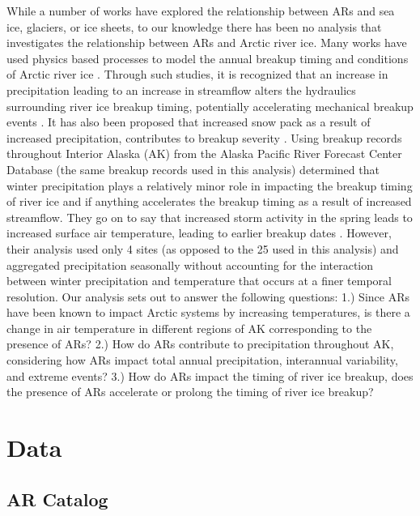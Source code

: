 \documentclass[12pts,draft]{AR_analysis_}
\begin{document}
While a number of works have explored
the relationship between ARs and sea ice, glaciers, or ice sheets, 
to our knowledge there has
been no analysis that investigates the relationship between ARs and Arctic
river ice. Many works have used physics based processes
to model the annual breakup timing and conditions of Arctic river ice
\cite{Paily, ashton1986river, Prowse_Bonsal_Duguay_Lacroix_2007,
jasek1998, shen_newest}. Through such studies, it is recognized that an 
increase in precipitation leading to an increase in
streamflow alters the hydraulics surrounding river ice breakup timing, 
potentially accelerating mechanical breakup events \cite{ashton1986river}.
It has also been proposed that increased snow pack as a result of increased 
precipitation, contributes to breakup severity \cite{Prowes2002}. Using 
breakup records throughout Interior Alaska (AK) from the Alaska 
Pacific River Forecast Center Database
(the same breakup records used in this analysis)  determined 
that winter precipitation plays a relatively minor role in impacting the 
breakup timing of river ice and if anything accelerates the breakup timing as a 
result of increased streamflow. They go on to say that 
increased storm activity in the spring leads to increased surface air 
temperature, leading to earlier breakup dates \cite{Bieniek2011}. However, 
their analysis used only 4 sites (as opposed to the 25 used in this analysis) 
and aggregated precipitation seasonally without accounting for the interaction 
between winter precipitation and temperature that occurs at a finer temporal
resolution. Our analysis sets out to answer the following questions: 
1.) Since ARs have been known to impact Arctic systems by increasing 
temperatures, is there a change in
air temperature in different regions of AK corresponding to the 
presence of ARs?
2.) How do ARs contribute to precipitation throughout AK, 
considering how ARs impact total annual precipitation, interannual 
variability, and extreme events?
3.) How do ARs impact the timing of river ice breakup, does the presence 
of ARs accelerate or prolong the timing of river ice breakup?

\section{Data}

\subsection{AR Catalog}
\end{document}
